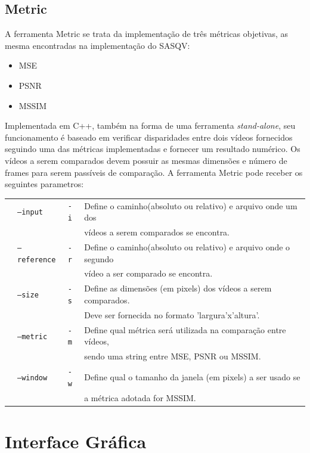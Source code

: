 \subsection{Metric}
\label{des:metric}

A ferramenta Metric se trata da implementação de três métricas objetivas, as mesma encontradas na implementação do SASQV:

\begin{itemize}
	\item MSE
	\item PSNR
	\item MSSIM
\end{itemize}

Implementada em C++, também na forma de uma ferramenta \emph{stand-alone}, seu funcionamento é baseado em verificar disparidades entre dois vídeos fornecidos seguindo uma das métricas implementadas e fornecer um resultado numérico. 
Os vídeos a serem comparados devem possuir as mesmas dimensões e número de frames para serem passíveis de comparação. 
A ferramenta Metric pode receber os seguintes parametros:

\begin{table}[!h]
	\begin{tabular}{llll}
	& \texttt{--input} & \texttt{-i} & Define o caminho(absoluto ou relativo) e arquivo onde um dos \\ 
	& & & vídeos a serem comparados se encontra. \\
	& \texttt{--reference} & \texttt{-r} & Define o caminho(absoluto ou relativo) e arquivo onde o segundo \\
	& & & vídeo a ser comparado se encontra. \\
	& \texttt{--size} & \texttt{-s} & Define as dimensões (em pixels) dos vídeos a serem comparados. \\ 
	& & & Deve ser fornecida no formato 'largura'x'altura'. \\
	& \texttt{--metric} & \texttt{-m} & Define qual métrica será utilizada na comparação entre vídeos, \\
	& & & sendo uma string entre MSE, PSNR ou MSSIM. \\
	& \texttt{--window} & \texttt{-w} & Define qual o tamanho da janela (em pixels) a ser usado se \\ 
	& & & a métrica adotada for MSSIM. \\
	\end{tabular}
\end{table}

\section{Interface Gráfica}

